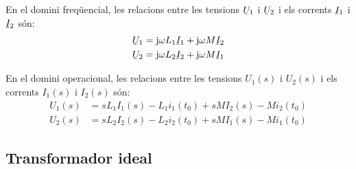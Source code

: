 En el domini freq\"{u}encial, les relacions entre les tensions $\cmplx{U}_1$ i $\cmplx{U}_2$ i els corrents $\cmplx{I}_1$ i $\cmplx{I}_2$ s\'{o}n:
\begin{align}
   \cmplx{U}_1 &= \ju \omega L_1 \cmplx{I}_1 + \ju \omega M \cmplx{I}_2 \\
   \cmplx{U}_2 &= \ju \omega L_2 \cmplx{I}_2 + \ju \omega M \cmplx{I}_1
\end{align}

En el domini operacional, les relacions entre les tensions $U_1(s)$  i $U_2(s)$ i els corrents $I_1(s)$ i $I_2(s)$ s\'{o}n:
\begin{align}
   U_1(s) &= s L_1 I_1(s) - L_1 i_1(t_0) + s M I_2(s) - M i_2(t_0) \\
   U_2(s) &= s L_2 I_2(s) - L_2 i_2(t_0) + s M I_1(s) - M i_1(t_0)
\end{align}

\subsection{Transformador ideal} 

